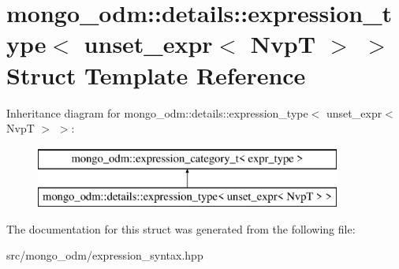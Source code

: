\hypertarget{structmongo__odm_1_1details_1_1expression__type_3_01unset__expr_3_01NvpT_01_4_01_4}{}\section{mongo\+\_\+odm\+:\+:details\+:\+:expression\+\_\+type$<$ unset\+\_\+expr$<$ NvpT $>$ $>$ Struct Template Reference}
\label{structmongo__odm_1_1details_1_1expression__type_3_01unset__expr_3_01NvpT_01_4_01_4}
Inheritance diagram for mongo\+\_\+odm\+:\+:details\+:\+:expression\+\_\+type$<$ unset\+\_\+expr$<$ NvpT $>$ $>$\+:\begin{figure}[H]
\begin{center}
\leavevmode
\includegraphics[height=2.000000cm]{structmongo__odm_1_1details_1_1expression__type_3_01unset__expr_3_01NvpT_01_4_01_4}
\end{center}
\end{figure}


The documentation for this struct was generated from the following file\+:\begin{DoxyCompactItemize}
\item 
src/mongo\+\_\+odm/expression\+\_\+syntax.\+hpp\end{DoxyCompactItemize}
